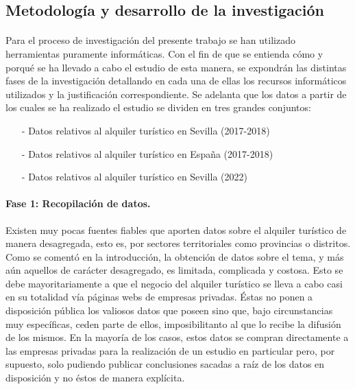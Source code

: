 \documentclass[a4paper,10pt]{article}
\begin{document}
\begin{multicols}{2}
        \clearpage
        \section{Metodología y desarrollo de la investigación}

            \paragraph*{}
            Para el proceso de investigación del presente trabajo se han utilizado herramientas puramente informáticas. Con el fin de que se entienda cómo y 
            porqué se ha llevado a cabo el estudio de esta manera, se expondrán las distintas fases de la investigación detallando en cada una de ellas los recursos 
            informáticos utilizados y la justificación correspondiente. Se adelanta que los datos a partir de los cuales se ha realizado el estudio se dividen
            en tres grandes conjuntos:

            \begin{itemize}
                    
                \item[-] Datos relativos al alquiler turístico en Sevilla (2017-2018)
                \item[-] Datos relativos al alquiler turístico en España (2017-2018)
                \item[-] Datos relativos al alquiler turístico en Sevilla (2022)
            
            \end{itemize} 

            \paragraph*{\textbf{Fase 1: Recopilación de datos.}}
            Existen muy pocas fuentes fiables que aporten datos sobre el alquiler turístico de manera desagregada, esto es, 
            por sectores territoriales como provincias o distritos.
            Como se comentó en la introducción, la obtención de datos sobre el tema, y más aún aquellos de carácter desagregado, es limitada, complicada
            y costosa. Esto se debe mayoritariamente a que el negocio del alquiler turístico se lleva a cabo casi en su totalidad vía páginas webs de empresas
            privadas. Éstas no ponen a disposición pública los valiosos datos que poseen sino que, bajo circunstancias muy específicas, ceden parte de ellos, imposibilitanto al que lo recibe la difusión de los mismos. En la mayoría de los casos, estos datos se compran directamente a las empresas privadas para 
            la realización de un estudio en particular pero, por supuesto, solo pudiendo publicar conclusiones sacadas a raíz de los datos en disposición y no éstos 
            de manera explícita. \\


\end{multicols}
\end{document}
